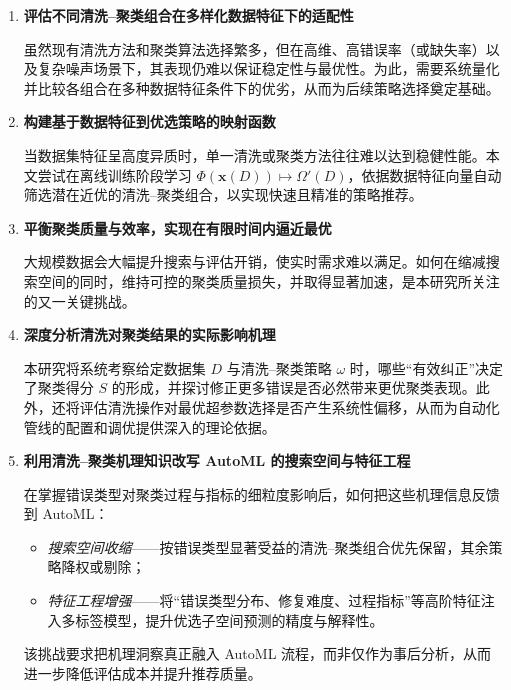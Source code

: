 \documentclass[10pt]{article} %
\numberwithin{equation}{section}
\begin{document}
\begin{enumerate}[label=($Q_{\arabic*}$), leftmargin=25pt]
    \item \textbf{评估不同清洗–聚类组合在多样化数据特征下的适配性}

    虽然现有清洗方法和聚类算法选择繁多，但在高维、高错误率（或缺失率）以及复杂噪声场景下，其表现仍难以保证稳定性与最优性。为此，需要系统量化并比较各组合在多种数据特征条件下的优劣，从而为后续策略选择奠定基础。

    \item \textbf{构建基于数据特征到优选策略的映射函数}

    当数据集特征呈高度异质时，单一清洗或聚类方法往往难以达到稳健性能。本文尝试在离线训练阶段学习
    \(\Phi(\mathbf{x}(D)) \mapsto \Omega'(D)\)，依据数据特征向量自动筛选潜在近优的清洗–聚类组合，以实现快速且精准的策略推荐。

    \item \textbf{平衡聚类质量与效率，实现在有限时间内逼近最优}

    大规模数据会大幅提升搜索与评估开销，使实时需求难以满足。如何在缩减搜索空间的同时，维持可控的聚类质量损失，并取得显著加速，是本研究所关注的又一关键挑战。

    \item \textbf{深度分析清洗对聚类结果的实际影响机理}

    本研究将系统考察给定数据集 \(D\) 与清洗–聚类策略 \(\omega\) 时，哪些“有效纠正”决定了聚类得分 \(S\) 的形成，并探讨修正更多错误是否必然带来更优聚类表现。此外，还将评估清洗操作对最优超参数选择是否产生系统性偏移，从而为自动化管线的配置和调优提供深入的理论依据。

    \item \textbf{\textcolor[rgb]{0.00,0.07,1.00}{利用清洗–聚类机理知识改写 AutoML 的搜索空间与特征工程}}

          \textcolor[rgb]{0.00,0.07,1.00}{在掌握错误类型对聚类过程与指标的细粒度影响后，如何把这些机理信息反馈到 AutoML：  
          \begin{itemize}[nosep,leftmargin=*,topsep=2pt]
              \item \emph{搜索空间收缩}——按错误类型显著受益的清洗–聚类组合优先保留，其余策略降权或剔除；  
              \item \emph{特征工程增强}——将“错误类型分布、修复难度、过程指标”等高阶特征注入多标签模型，提升优选子空间预测的精度与解释性。  
          \end{itemize}
          该挑战要求把机理洞察真正融入 AutoML 流程，而非仅作为事后分析，从而进一步降低评估成本并提升推荐质量。}
\end{enumerate}
\end{document}
